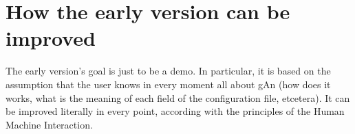 \section{How the early version can be improved}
The early version's goal is just to be a demo. In particular, it is based on the assumption that the user knows in every moment all about gAn (how does it works,  what is the meaning of each field of the configuration file, etcetera). It can be improved literally in every point, according with the principles of the Human Machine Interaction.

